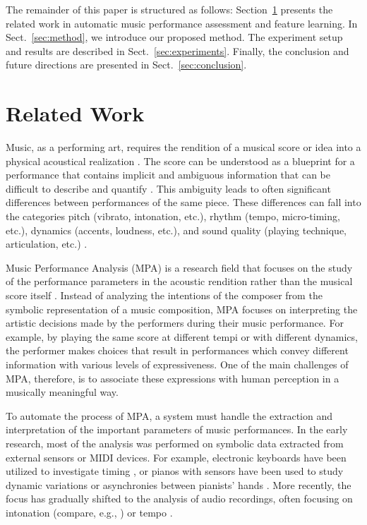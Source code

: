 \documentclass{ws-ijsc}
\begin{document}
The remainder of this paper is structured as follows: Section~\ref{sec:relatedwork} presents the related work in automatic music performance assessment and feature learning. In Sect.~\ref{sec:method}, we introduce our proposed method. The experiment setup and results are described in Sect.~\ref{sec:experiments}. Finally, the conclusion and future directions are presented in Sect.~\ref{sec:conclusion}.

\section{Related Work}\label{sec:relatedwork}
Music, as a performing art, requires the rendition of a musical score or idea into a physical acoustical realization \cite{lerch_software-based_2009}. The score can be understood as a blueprint for a performance \cite{clarke_understanding_2002} that contains implicit and ambiguous information that can be difficult to describe and quantify \cite{dorian_history_1942,meyer_emotion_1956,Palmer1997,beran_analyzing_1999}. This ambiguity leads to often significant differences between performances of the same piece. These differences can fall into the categories pitch (vibrato, intonation, etc.), rhythm (tempo, micro-timing, etc.), dynamics (accents, loudness, etc.), and sound quality (playing technique, articulation, etc.) \cite{Lerch2012}.

Music Performance Analysis (MPA) is a research field that focuses on the study of the performance parameters in the acoustic rendition rather than the musical score itself \cite{lerch_software-based_2009}. 
Instead of analyzing the intentions of the composer from the symbolic representation of a music composition, MPA focuses on interpreting the artistic decisions made by the performers during their music performance. For example, by playing the same score at different tempi or with different dynamics, the performer makes choices that result in performances which convey different information with various levels of expressiveness. One of the main challenges of MPA, therefore, is to associate these expressions with human perception in a musically meaningful way.

To automate the process of MPA, a system must handle the extraction and interpretation of the important parameters of music performances. In the early research, most of the analysis was performed on symbolic data extracted from external sensors or MIDI devices. For example, electronic keyboards have been utilized to investigate timing \cite{desain_does_1994}, or pianos with sensors have been used to study dynamic variations \cite{repp_dynamics_1996} or asynchronies between pianists' hands \cite{goebl_melody_2001}.
More recently, the focus has gradually shifted to the analysis of audio recordings, often focusing on intonation (compare, e.g., \cite{walker_instrumental_2004}) or tempo \cite{dixon_automatic_2001}.
\end{document}
